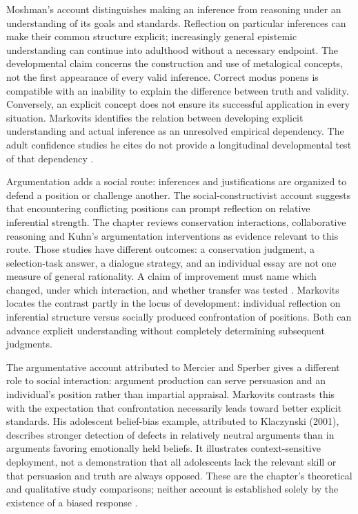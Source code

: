 Moshman's account distinguishes making an inference from reasoning under an
understanding of its goals and standards. Reflection on particular inferences
can make their common structure explicit; increasingly general epistemic
understanding can continue into adulthood without a necessary endpoint.
The developmental claim concerns the construction and use of metalogical
concepts, not the first appearance of every valid inference. Correct modus
ponens is compatible with an inability to explain the difference between truth
and validity. Conversely, an explicit concept does not ensure its successful
application in every situation. Markovits identifies the relation between
developing explicit understanding and actual inference as an unresolved
empirical dependency. The adult confidence studies he cites do not provide a
longitudinal developmental test of that dependency
\cite[pp.~779--780]{Markovits2021DevelopmentRationality}.

Argumentation adds a social route: inferences and justifications are organized
to defend a position or challenge another. The social-constructivist account
suggests that encountering conflicting positions can prompt reflection on
relative inferential strength. The chapter reviews conservation interactions,
collaborative reasoning and Kuhn's argumentation interventions as evidence
relevant to this route. Those studies have different outcomes: a conservation
judgment, a selection-task answer, a dialogue strategy, and an individual essay
are not one measure of general rationality. A claim of improvement must name
which changed, under which interaction, and whether transfer was tested
\cite[pp.~780--781]{Markovits2021DevelopmentRationality}.
Markovits locates the contrast partly in the locus of development: individual
reflection on inferential structure versus socially produced confrontation of
positions. Both can advance explicit understanding without completely
determining subsequent judgments.

The argumentative account attributed to Mercier and Sperber gives a different
role to social interaction: argument production can serve persuasion and an
individual's position rather than impartial appraisal. Markovits contrasts
this with the expectation that confrontation necessarily leads toward better
explicit standards. His adolescent belief-bias example, attributed to
Klaczynski (2001), describes stronger detection of defects in relatively neutral
arguments than in arguments favoring emotionally held beliefs. It illustrates
context-sensitive deployment, not a demonstration that all adolescents lack
the relevant skill or that persuasion and truth are always opposed. These are
the chapter's theoretical and qualitative study comparisons; neither account
is established solely by the existence of a biased response
\cite[pp.~780--781]{Markovits2021DevelopmentRationality}.

